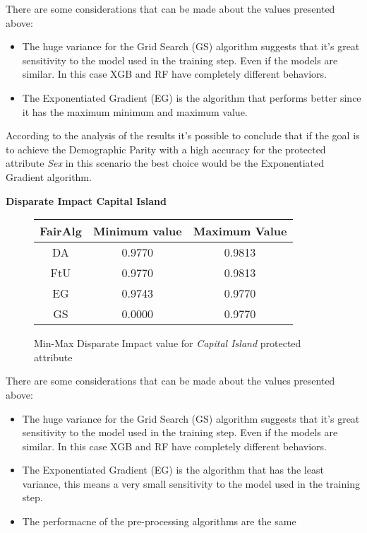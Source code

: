 There are some considerations that can be made about the values presented above:

\begin{itemize}

    \item The huge variance for the Grid Search (GS) algorithm suggests that it's great sensitivity to the model used in the training step. Even if the models are similar. In this case XGB and RF have completely different behaviors.

    \item The Exponentiated Gradient (EG) is the algorithm that performs better since it has the maximum minimum and maximum value.

\end{itemize}

According to the analysis of the results it's possible to conclude that if the goal is to achieve the Demographic Parity with a high accuracy for the protected attribute \emph{Sex} in this scenario the best choice would be the Exponentiated Gradient algorithm.


\newpage
\textbf{Disparate Impact Capital Island}
\begin{figure}[H]
    \centering
    \begin{tabular}{|c|c|c|}
        \hline
        \textbf{FairAlg} & \textbf{Minimum value} & \textbf{Maximum Value} \\
        \hline
        DA & 0.9770 & 0.9813 \\
        \hline
        FtU & 0.9770 & 0.9813 \\
        \hline
        EG & 0.9743 & 0.9770 \\
        \hline
        GS & 0.0000 & 0.9770 \\
        \hline
    \end{tabular}
    \caption{Min-Max Disparate Impact value for \emph{Capital Island} protected attribute}
\end{figure}

There are some considerations that can be made about the values presented above:

\begin{itemize}

    \item The huge variance for the Grid Search (GS) algorithm suggests that it's great sensitivity to the model used in the training step. Even if the models are similar. In this case XGB and RF have completely different behaviors.

    \item The Exponentiated Gradient (EG) is the algorithm that has the least variance, this means a very small sensitivity to the model used in the training step.

    \item The performacne of the pre-processing algorithms are the same

\end{itemize}

